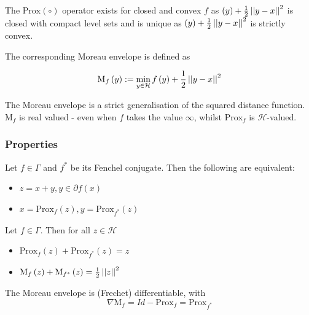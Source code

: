 \documentclass{article}
\begin{document}
The \(\mathrm{Prox}\left(\circ\right)\) operator exists for closed and convex \(f\) as \(\left(y\right) + \frac{1}{2}\left|\left|y-x\right|\right|^2\) is closed with compact level sets and is unique as \(\left(y\right) + \frac{1}{2}\left|\left|y-x\right|\right|^2\) is strictly convex.

The corresponding Moreau envelope is defined as 

\begin{definition}
\begin{equation}
\mathrm{M}_f\left(y\right) :=  \min_{y \in \mathcal{H}} f\left(y\right) + \frac{1}{2}\left|\left|y-x\right|\right|^2
\end{equation}
\end{definition}

The Moreau envelope is a strict generalisation of the squared distance function. \(\mathrm{M}_f\) is real valued - even when \(f\) takes the value \(\infty\), whilst \(\mathrm{Prox}_f \) is \(\mathcal{H}\)-valued. 

\subsubsection{Properties}
\begin{theorem}[Moreau '65]
Let \(f \in \Gamma\) and \(f^*\) be its Fenchel conjugate. Then the following are equivalent:
\begin{itemize}
\item \(z = x+y, y \in \partial f\left(x\right)\)
\item \(x = \mathrm{Prox}_f\left(z\right), y = \mathrm{Prox}_{f^*}\left(z\right)  \)
\end{itemize}
\end{theorem}

\begin{theorem}[Moreau '65]
Let \(f \in \Gamma\). Then for all \(z \in \mathcal{H}\)
\begin{itemize}
\item \( \mathrm{Prox}_f\left(z\right) + \mathrm{Prox}_{f^*}\left(z\right) = z   \)
\item \( \mathrm{M}_f\left(z\right)  + \mathrm{M}_{f^*}\left(z\right)  = \frac{1}{2}\left|\left|z\right|\right|^2 \)
\end{itemize}
\end{theorem}

\begin{theorem}[Moreau '65]
The Moreau envelope is (Frechet) differentiable, with 
\begin{equation}
\nabla \mathrm{M}_f = Id - \mathrm{Prox}_{f} = \mathrm{Prox}_{f^*}
\end{equation}
\end{theorem}
\end{document}
